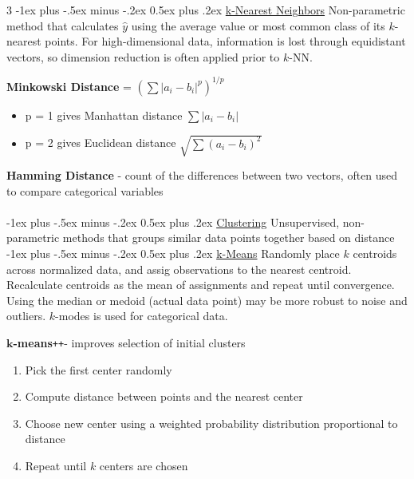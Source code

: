 \documentclass[10pt,landscape,letterpaper]{article}
\makeatletter
\renewcommand{\section}{\@startsection{section}{1}{0mm}%
                                {-1ex plus -.5ex minus -.2ex}%
                                {0.5ex plus .2ex}%
                                {\normalfont\large\bfseries}}
\renewcommand{\subsection}{\@startsection{subsection}{2}{0mm}%
                                {-1ex plus -.5ex minus -.2ex}%
                                {0.5ex plus .2ex}%
                                {\normalfont\normalsize\bfseries}}
\makeatother
\begin{document}
\begin{multicols}{3}
\section{\href{https://migue-rc.github.io/Data-Science-Cheatsheet/\#k-nearest-neighbors}{k-Nearest Neighbors}}
Non-parametric method that calculates $\hat{y}$ using the average value or most common class of its $k$-nearest points. For high-dimensional data, information is lost through equidistant vectors, so dimension reduction is often applied prior to $k$-NN.

\textbf{Minkowski Distance} = $(\sum|a_i - b_i|^p)^{1/p}$
\begin{itemize}[label={--},leftmargin=4mm]
\itemsep -.4mm
\item p = 1 gives Manhattan distance ${\sum|a_i - b_i|}$
\item p = 2 gives Euclidean distance $\sqrt{\sum(a_i - b_i)^2}$
\end{itemize}

\textbf{Hamming Distance} - count of the differences between two vectors, often used to compare categorical variables \\

\columnbreak
\textcolor{white}{.}\vspace{-5mm}\\ %
\section{\href{https://migue-rc.github.io/Data-Science-Cheatsheet/\#clustering}{Clustering}}
Unsupervised, non-parametric methods that groups similar data points together based on distance
\subsection{\href{https://migue-rc.github.io/Data-Science-Cheatsheet/\#k-means}{k-Means}}
Randomly place $k$ centroids across normalized data, and assig observations to the nearest centroid. Recalculate centroids as the mean of assignments and repeat until convergence. Using the median or medoid (actual data point) may be more robust to noise and outliers. $k$-modes is used for categorical data.

\def\Plus{\texttt{+}}
$\boldsymbol{k}$\textbf{-means}\Plus\Plus\hspace{1mm}- improves selection of initial clusters
\begin{enumerate}[leftmargin=5mm]
\itemsep -.4mm
\item Pick the first center randomly
\item Compute distance between points and the nearest center
\item Choose new center using a weighted probability distribution proportional to distance
\item Repeat until $k$ centers are chosen
\end{enumerate}


\end{multicols}
\end{document}
